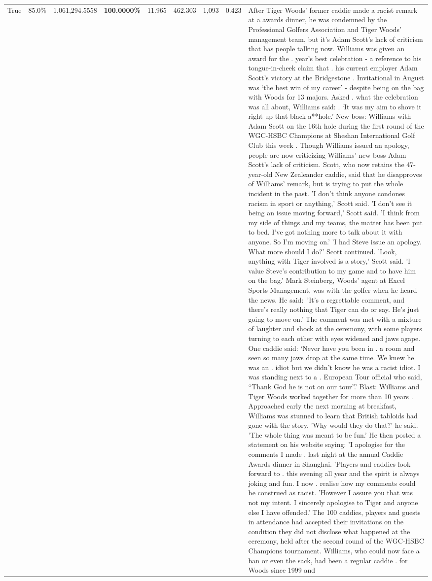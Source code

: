 \begin{table}[H]
\begin{tabular}{lllrlllll}
True & 85.0\% & 1,061,294.5558 & \bfseries \color{red} 100.0000\% & 11.965 & 462.303 & 1,093 & 0.423 & After Tiger Woods' former caddie made a racist remark at a awards dinner, he was condemned by the Professional Golfers Association and Tiger Woods' management team, but it's Adam Scott's lack of criticism that has people talking now. Williams was given an award for the . year’s best celebration - a reference to his tongue-in-cheek claim that . his current employer Adam Scott’s victory at the Bridgestone . Invitational in August was ‘the best win of my career’ - despite being on the bag with Woods for 13 majors. Asked . what the celebration was all about, Williams said: . ‘It was my aim to shove it right up that black a**hole.’ New boss: Williams with Adam Scott  on the 16th hole during the first round of the WGC-HSBC Champions at Sheshan International Golf Club this week . Though Williams issued an apology, people are now criticizing Williams' new boss Adam Scott's lack of criticism. Scott, who now retains the 47-year-old New Zealeander caddie, said that he disapproves of Williams' remark, but is trying to put the whole incident in the past. 'I don't think anyone condones racism in sport or anything,' Scott said. 'I don't see it being an issue moving forward,' Scott said. 'I think from my side of things and my teams, the matter has been put to bed. I've got nothing more to talk about it with anyone. So I'm moving on.' 'I had Steve issue an apology. What more should I do?' Scott continued. 'Look, anything with Tiger involved is a story,' Scott said. 'I value Steve's contribution to my game and to have him on the bag.' Mark Steinberg, Woods' agent at Excel Sports Management, was with the golfer when he heard the news. He said: 'It's a regrettable comment, and there's really nothing that Tiger can do or say. He's just going to move on.' The comment was met with a mixture of laughter and shock at the ceremony, with some players turning to each other with eyes widened and jaws agape. One caddie said: ‘Never have you been in . a room and seen so many jaws drop at the same time. We knew he was an . idiot but we didn’t know he was a racist idiot. I was standing next to a . European Tour official who said, “Thank God he is not on our tour”.’ Blast: Williams and Tiger Woods worked together for more than 10 years . Approached early the next morning at breakfast, Williams was stunned to learn that British tabloids had gone with the story. 'Why would they do that?' he said. 'The whole thing was meant to be fun.' He then posted a statement on his website saying: 'I apologise for the comments I made . last night at the annual Caddie Awards dinner in Shanghai. 'Players and caddies look forward to . this evening all year and the spirit is always joking and fun. I now . realise how my comments could be construed as racist. 'However I assure you that was not my intent. I sincerely apologise to Tiger and anyone else I have offended.' The 100 caddies, players and guests in attendance had accepted their invitations on the condition they did not disclose what happened at the ceremony, held after the second round of the WGC-HSBC Champions tournament. Williams, who could now face a ban or even the sack, had been a regular caddie . for Woods since 1999 and 
\end{tabular}
\end{table}
